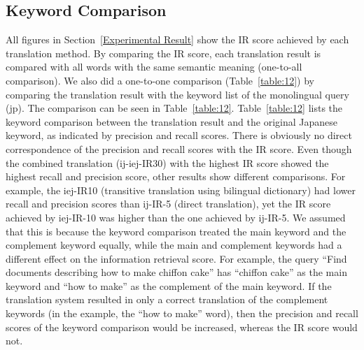 \documentclass[english]{jnlp_1.3c}
\begin{document}
\subsection{Keyword Comparison}
\label{Keyword Comparison}

All figures in Section~\ref{Experimental Result} show the IR score
achieved by each translation method. By comparing the IR score, each
translation result is compared with all words with the same semantic
meaning (one-to-all comparison). We also did a one-to-one comparison
(Table~\ref{table:12}) by comparing the translation result with the
keyword list of the monolingual query (jp). The comparison can be seen
in Table~\ref{table:12}.  Table~\ref{table:12} lists the keyword
comparison between the translation result and the original Japanese
keyword, as indicated by precision and recall scores. There is obviously
no direct correspondence of the precision and recall scores with the IR
score. Even though the combined translation (ij-iej-IR30) with the
highest IR score showed the highest recall and precision score, other
results show different comparisons. For example, the iej-IR10
(transitive translation using bilingual dictionary) had lower recall and
precision scores than ij-IR-5 (direct translation), yet the IR score
achieved by iej-IR-10 was higher than the one achieved by ij-IR-5. We
assumed that this is because the keyword comparison treated the main
keyword and the complement keyword equally, while the main and
complement keywords had a different effect on the information retrieval
score. For example, the query ``Find documents describing how to make
chiffon cake'' has ``chiffon cake'' as the main keyword and ``how to
make'' as the complement of the main keyword.  If the translation system
resulted in only a correct translation of the complement keywords (in
the example, the ``how to make'' word), then the precision and recall
scores of the keyword comparison would be increased, whereas the IR
score would not.
\end{document}
